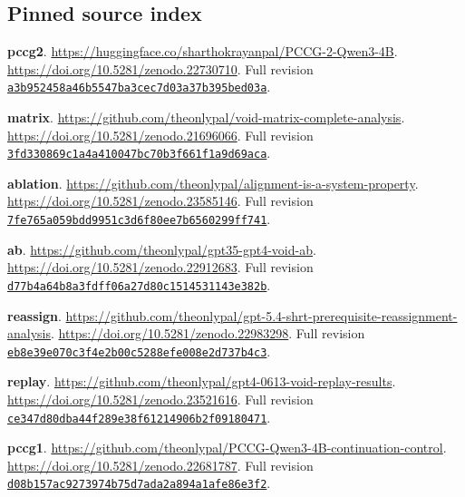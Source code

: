\documentclass[11pt,letterpaper]{article}
\begin{document}
\subsection*{Pinned source index}
{\small
\textbf{pccg2}. \url{https://huggingface.co/sharthokrayanpal/PCCG-2-Qwen3-4B}. \url{https://doi.org/10.5281/zenodo.22730710}. Full revision \href{https://huggingface.co/sharthokrayanpal/PCCG-2-Qwen3-4B/tree/a3b952458a46b5547ba3cec7d03a37b395bed03a}{\nolinkurl{a3b952458a46b5547ba3cec7d03a37b395bed03a}}.

\textbf{matrix}. \url{https://github.com/theonlypal/void-matrix-complete-analysis}. \url{https://doi.org/10.5281/zenodo.21696066}. Full revision \href{https://github.com/theonlypal/void-matrix-complete-analysis/commit/3fd330869c1a4a410047bc70b3f661f1a9d69aca}{\nolinkurl{3fd330869c1a4a410047bc70b3f661f1a9d69aca}}.

\textbf{ablation}. \url{https://github.com/theonlypal/alignment-is-a-system-property}. \url{https://doi.org/10.5281/zenodo.23585146}. Full revision \href{https://github.com/theonlypal/alignment-is-a-system-property/commit/7fe765a059bdd9951c3d6f80ee7b6560299ff741}{\nolinkurl{7fe765a059bdd9951c3d6f80ee7b6560299ff741}}.

\textbf{ab}. \url{https://github.com/theonlypal/gpt35-gpt4-void-ab}. \url{https://doi.org/10.5281/zenodo.22912683}. Full revision \href{https://github.com/theonlypal/gpt35-gpt4-void-ab/commit/d77b4a64b8a3fdff06a27d80c1514531143e382b}{\nolinkurl{d77b4a64b8a3fdff06a27d80c1514531143e382b}}.

\textbf{reassign}. \url{https://github.com/theonlypal/gpt-5.4-shrt-prerequisite-reassignment-analysis}. \url{https://doi.org/10.5281/zenodo.22983298}. Full revision \href{https://github.com/theonlypal/gpt-5.4-shrt-prerequisite-reassignment-analysis/commit/eb8e39e070c3f4e2b00c5288efe008e2d737b4c3}{\nolinkurl{eb8e39e070c3f4e2b00c5288efe008e2d737b4c3}}.

\textbf{replay}. \url{https://github.com/theonlypal/gpt4-0613-void-replay-results}. \url{https://doi.org/10.5281/zenodo.23521616}. Full revision \href{https://github.com/theonlypal/gpt4-0613-void-replay-results/commit/ce347d80dba44f289e38f61214906b2f09180471}{\nolinkurl{ce347d80dba44f289e38f61214906b2f09180471}}.

\textbf{pccg1}. \url{https://github.com/theonlypal/PCCG-Qwen3-4B-continuation-control}. \url{https://doi.org/10.5281/zenodo.22681787}. Full revision \href{https://github.com/theonlypal/PCCG-Qwen3-4B-continuation-control/commit/d08b157ac9273974b75d7ada2a894a1afe86e3f2}{\nolinkurl{d08b157ac9273974b75d7ada2a894a1afe86e3f2}}.

}
\end{document}
